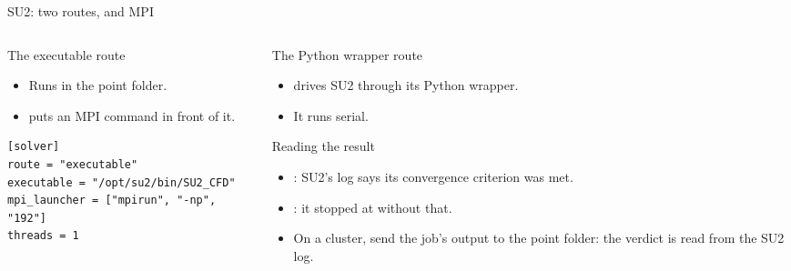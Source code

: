 \begin{frame}[fragile]{SU2: two routes, and MPI}
\begin{columns}[T]
\begin{column}{0.48\textwidth}
\begin{block}{The executable route}
\begin{itemize}\small
  \item Runs  in the point folder.
  \item {} puts an MPI command in front of it.
\end{itemize}
\end{block}
\begin{lstlisting}[style=cfdbtoml]
[solver]
route = "executable"
executable = "/opt/su2/bin/SU2_CFD"
mpi_launcher = ["mpirun", "-np", "192"]
threads = 1
\end{lstlisting}
\end{column}
\begin{column}{0.48\textwidth}
\begin{block}{The Python wrapper route}
\begin{itemize}\small
  \item {} drives SU2 through its Python wrapper.
  \item It runs serial.
\end{itemize}
\end{block}
\begin{block}{Reading the result}
\begin{itemize}\small
  \item {}: SU2's log says its convergence criterion was met.
  \item {}: it stopped at  without
        that.
  \item On a cluster, send the job's output to the point folder: the
        verdict is read from the SU2 log.
\end{itemize}
\end{block}
\end{column}
\end{columns}
\end{frame}

